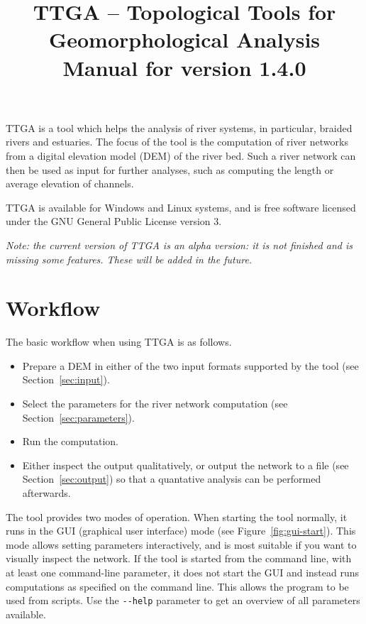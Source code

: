 \documentclass{article}
\title{TTGA -- Topological Tools for Geomorphological Analysis \\[5mm] \large Manual for version 1.4.0}
\author{}
\date{}
\begin{document}
\maketitle

TTGA is a tool which helps the analysis of river systems, in particular, braided rivers and estuaries. The focus of the tool is the computation of river networks from a digital elevation model (DEM) of the river bed. Such a river network can then be used as input for further analyses, such as computing the length or average elevation of channels.

TTGA is available for Windows and Linux systems, and is free software licensed under the GNU General Public License version 3.

\emph{Note: the current version of TTGA is an alpha version: it is not finished and is missing some features. These will be added in the future.}


\tableofcontents


\section{Workflow}

The basic workflow when using TTGA is as follows.

\begin{itemize}
    \item Prepare a DEM in either of the two input formats supported by the tool (see Section~\ref{sec:input}).
    \item Select the parameters for the river network computation (see Section~\ref{sec:parameters}).
    \item Run the computation.
    \item Either inspect the output qualitatively, or output the network to a file (see Section~\ref{sec:output}) so that a quantative analysis can be performed afterwards.
\end{itemize}

The tool provides two modes of operation. When starting the tool normally, it runs in the GUI (graphical user interface) mode (see Figure~\ref{fig:gui-start}). This mode allows setting parameters interactively, and is most suitable if you want to visually inspect the network. If the tool is started from the command line, with at least one command-line parameter, it does not start the GUI and instead runs computations as specified on the command line. This allows the program to be used from scripts. Use the \texttt{-{}-help} parameter to get an overview of all parameters available.
\end{document}
